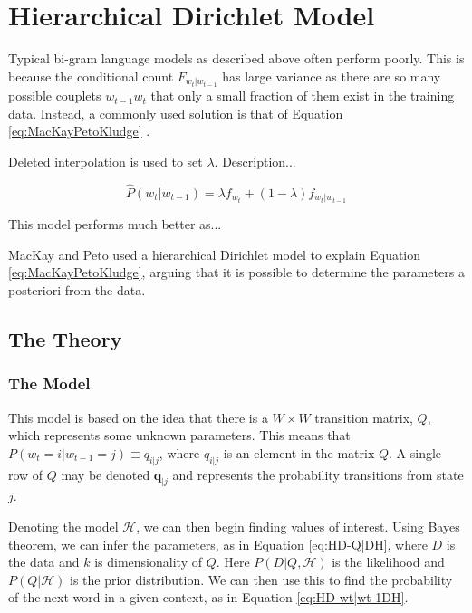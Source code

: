 \chapter{Hierarchical Dirichlet Model}

Typical bi-gram language models as described above often perform poorly. This is because the conditional count $F_{w_{t}|w_{t-1}}$ has large variance as there are so many possible couplets $w_{t-1}w_{t}$ that only a small fraction of them exist in the training data. Instead, a commonly used solution is that of Equation \ref{eq:MacKayPetoKludge} \cite{mackay1995hierarchical}. 

Deleted interpolation \cite{jelinek1980interpolated} is used to set $\lambda$. Description...


\begin{equation}
\hat{P}(w_{t}|w_{t-1})=\lambda f_{w_{t}}+(1-\lambda)f_{w_{t}|w_{t-1}}
\label{eq:MacKayPetoKludge}
\end{equation}

This model performs much better as...


MacKay and Peto \cite{mackay1995hierarchical} used a hierarchical Dirichlet model to explain Equation \ref{eq:MacKayPetoKludge}, arguing that it is possible to determine the parameters a posteriori from the data.

\section{The Theory}

\subsection{The Model}

This model is based on the idea that there is a $W\times W$ transition matrix, $Q$, which represents some unknown parameters. This means that $P(w_{t}=i|w_{t-1}=j)\equiv q_{i|j}$, where $q_{i|j}$ is an element in the matrix $Q$. A single row of $Q$ may be denoted $\boldsymbol{q}_{|j}$ and represents the probability transitions from state $j$.

Denoting the model $\mathscr{H}$, we can then begin finding values of interest. Using Bayes theorem, we can infer the parameters, as in Equation \ref{eq:HD-Q|DH}, where $D$ is the data and $k$ is dimensionality of $Q$. Here $P(D|Q,\mathscr{H})$ is the likelihood and $P(Q|\mathscr{H})$ is the prior distribution. We can then use this to find the probability of the next word in a given context, as in Equation \ref{eq:HD-wt|wt-1DH}.

